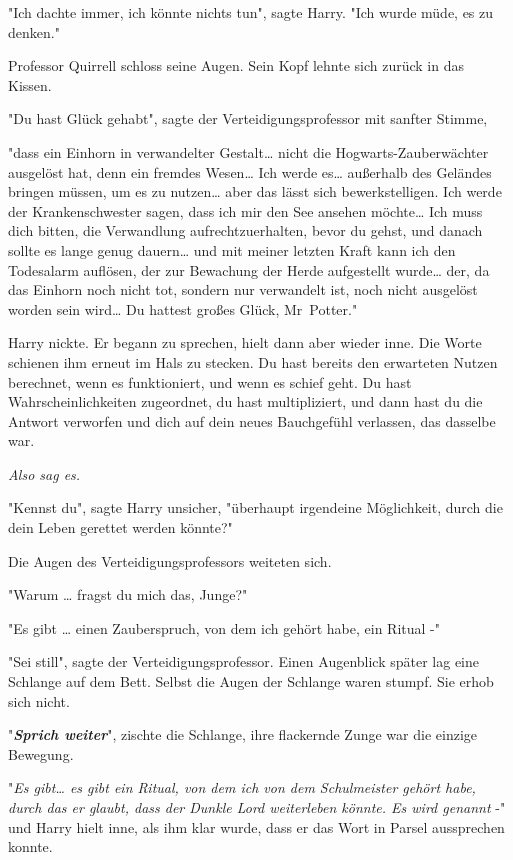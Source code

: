 {"Ich dachte immer, ich könnte nichts tun", sagte Harry. "Ich wurde müde, es zu denken."

Professor Quirrell schloss seine Augen. Sein Kopf lehnte sich zurück in das Kissen.

"Du hast Glück gehabt", sagte der Verteidigungsprofessor mit sanfter Stimme,

"dass ein Einhorn in verwandelter Gestalt… nicht die Hogwarts-Zauberwächter ausgelöst hat, denn ein fremdes Wesen… Ich werde es… außerhalb des Geländes bringen müssen, um es zu nutzen… aber das lässt sich bewerkstelligen. Ich werde der Krankenschwester sagen, dass ich mir den See ansehen möchte… Ich muss dich bitten, die Verwandlung aufrechtzuerhalten, bevor du gehst, und danach sollte es lange genug dauern… und mit meiner letzten Kraft kann ich den Todesalarm auflösen, der zur Bewachung der Herde aufgestellt wurde… der, da das Einhorn noch nicht tot, sondern nur verwandelt ist, noch nicht ausgelöst worden sein wird… Du hattest großes Glück, Mr~Potter."

Harry nickte. Er begann zu sprechen, hielt dann aber wieder inne. Die Worte schienen ihm erneut im Hals zu stecken. Du hast bereits den erwarteten Nutzen berechnet, wenn es funktioniert, und wenn es schief geht. Du hast Wahrscheinlichkeiten zugeordnet, du hast multipliziert, und dann hast du die Antwort verworfen und dich auf dein neues Bauchgefühl verlassen, das dasselbe war.

\emph{Also sag es.}

"Kennst du", sagte Harry unsicher, "überhaupt irgendeine Möglichkeit, durch die dein Leben gerettet werden könnte?"

Die Augen des Verteidigungsprofessors weiteten sich.

"Warum … fragst du mich das, Junge?"

"Es gibt … einen Zauberspruch, von dem ich gehört habe, ein Ritual -"

"Sei still", sagte der Verteidigungsprofessor. Einen Augenblick später lag eine Schlange auf dem Bett. Selbst die Augen der Schlange waren stumpf. Sie erhob sich nicht.

"\textbf{\emph{Sprich weiter}}", zischte die Schlange, ihre flackernde Zunge war die einzige Bewegung.

"\emph{Es gibt… es gibt ein Ritual, von dem ich von dem Schulmeister gehört habe, durch das er glaubt, dass der Dunkle Lord weiterleben könnte. Es wird genannt} -" und Harry hielt inne, als ihm klar wurde, dass er das Wort in Parsel aussprechen konnte.

}
